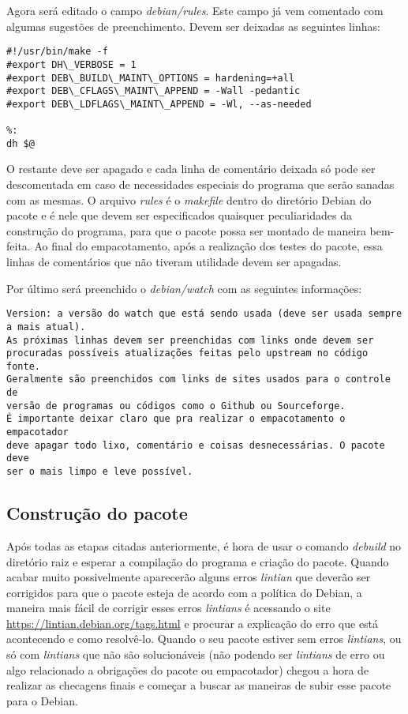Agora será editado o campo \textit{debian/rules}. Este campo já vem comentado com algumas sugestões de preenchimento. Devem ser deixadas as seguintes linhas:
\begin{verbatim}
#!/usr/bin/make -f
#export DH\_VERBOSE = 1
#export DEB\_BUILD\_MAINT\_OPTIONS = hardening=+all
#export DEB\_CFLAGS\_MAINT\_APPEND = -Wall -pedantic
#export DEB\_LDFLAGS\_MAINT\_APPEND = -Wl, --as-needed

%:
dh $@

\end{verbatim}
O restante deve ser apagado e cada linha de comentário deixada só pode ser descomentada em caso de necessidades especiais do programa que serão sanadas com as mesmas. O arquivo \textit{rules} é o \textit{makefile} dentro do diretório Debian do pacote e é nele que devem ser especificados quaisquer peculiaridades da construção do programa, para que o pacote possa ser montado de maneira bem-feita. Ao final do empacotamento, após a realização dos testes do pacote, essa linhas de comentários que não tiveram utilidade devem ser apagadas.

Por último será preenchido o \textit{debian/watch} com as seguintes informações:
\begin{verbatim}
Version: a versão do watch que está sendo usada (deve ser usada sempre
a mais atual).
As próximas linhas devem ser preenchidas com links onde devem ser 
procuradas possíveis atualizações feitas pelo upstream no código fonte.
Geralmente são preenchidos com links de sites usados para o controle de 
versão de programas ou códigos como o Github ou Sourceforge.
É importante deixar claro que pra realizar o empacotamento o empacotador
deve apagar todo lixo, comentário e coisas desnecessárias. O pacote deve
ser o mais limpo e leve possível.
\end{verbatim}

\subsection{Construção do pacote}

Após todas as etapas citadas anteriormente, é hora de usar o comando \textit{debuild} no diretório raiz e esperar a compilação do programa e criação do pacote. Quando acabar muito possivelmente aparecerão alguns erros \textit{lintian} que deverão ser corrigidos para que o pacote esteja de acordo com a política do Debian, a maneira mais fácil de corrigir esses erros \textit{lintians} é acessando o site \url{https://lintian.debian.org/tags.html} e procurar a explicação do erro que está acontecendo e como resolvê-lo. Quando o seu pacote estiver sem erros \textit{lintians}, ou só com \textit{lintians} que não são solucionáveis (não podendo ser \textit{lintians} de erro ou algo relacionado a obrigações do pacote ou empacotador) chegou a hora de realizar as checagens finais e começar a buscar as maneiras de subir esse pacote para o Debian.

